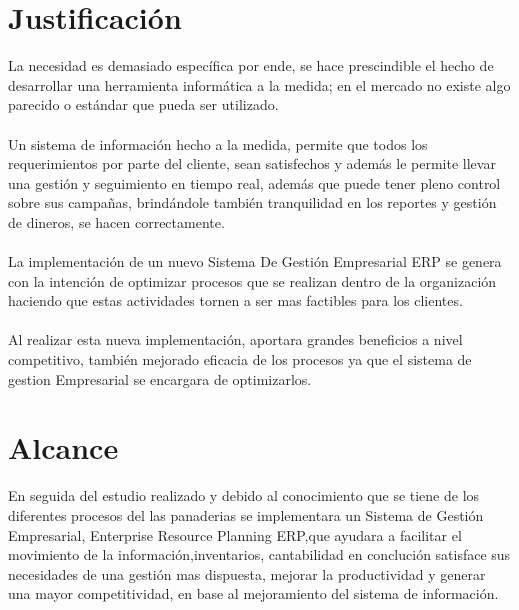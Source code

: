 \section{Justificaci\'on}
La necesidad es demasiado espec\'ifica por ende, se hace prescindible el hecho de desarrollar una herramienta inform\'atica a la medida; en el mercado no existe algo parecido o est\'andar que pueda ser utilizado.%
\\%
\\%
Un sistema de informaci\'on hecho a la medida, permite que todos los requerimientos por parte del cliente, sean satisfechos y adem\'as le permite llevar una gesti\'on y seguimiento en tiempo real, adem\'as que puede tener pleno control sobre sus campa\~nas, brind\'andole tambi\'en tranquilidad en los reportes y gesti\'on de dineros, se hacen correctamente.%
\\%
\\%
La implementaci\'on de un nuevo Sistema De Gesti\'on Empresarial ERP se genera con la intenci\'on de optimizar procesos que se realizan dentro de la organizaci\'on haciendo que estas actividades tornen a ser mas factibles para los clientes.
\\%
\\%
Al realizar esta nueva implementaci\'on, aportara grandes beneficios a nivel competitivo, tambi\'en mejorado eficacia de los procesos ya que el sistema de gestion Empresarial se encargara de optimizarlos.
%
\section{Alcance}
En seguida del estudio realizado y debido al conocimiento que se tiene de los diferentes procesos del las panaderias se implementara un Sistema de Gesti\'on Empresarial, Enterprise Resource Planning ERP,que ayudara a facilitar el movimiento de la informaci\'on,inventarios, cantabilidad en concluci\'on satisface sus necesidades de una gesti\'on mas dispuesta, mejorar la productividad y generar una mayor competitividad, en base al mejoramiento del sistema de informaci\'on.%